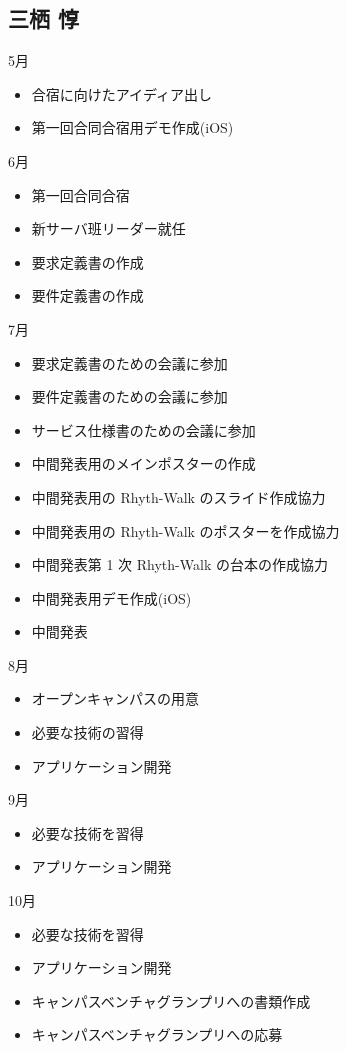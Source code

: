 \subsection{三栖 惇}
5月
\begin{itemize}
\item 合宿に向けたアイディア出し
\item 第一回合同合宿用デモ作成(iOS)
\end{itemize}
6月
\begin{itemize}
\item 第一回合同合宿
\item 新サーバ班リーダー就任
\item 要求定義書の作成
\item 要件定義書の作成
\end{itemize}
7月
\begin{itemize}
\item 要求定義書のための会議に参加
\item 要件定義書のための会議に参加
\item サービス仕様書のための会議に参加
\item 中間発表用のメインポスターの作成
\item 中間発表用の Rhyth-Walk のスライド作成協力
\item 中間発表用の Rhyth-Walk のポスターを作成協力
\item 中間発表第 1 次 Rhyth-Walk の台本の作成協力
\item 中間発表用デモ作成(iOS)
\item 中間発表
\end{itemize}
8月
\begin{itemize}
\item オープンキャンパスの用意
\item 必要な技術の習得
\item アプリケーション開発
\end{itemize}
9月
\begin{itemize}
\item 必要な技術を習得
\item アプリケーション開発
\end{itemize}
10月
\begin{itemize}
\item 必要な技術を習得
\item アプリケーション開発
\item キャンパスベンチャグランプリへの書類作成
\item キャンパスベンチャグランプリへの応募

\end{itemize}
